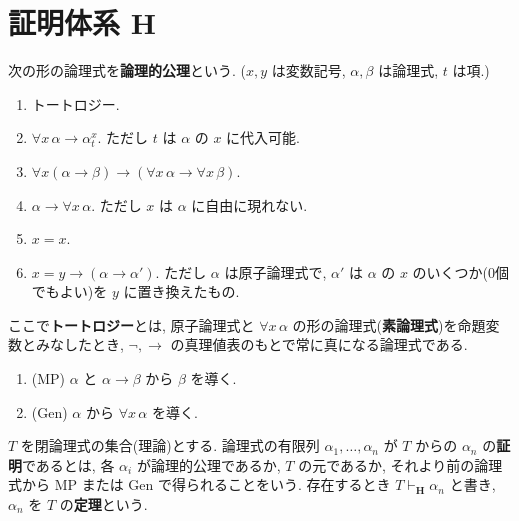\section{証明体系 $\mathbf{H}$}

\begin{dfn}\label{dfn:hilbert}
  次の形の論理式を\textbf{論理的公理}という. ($x, y$ は変数記号, $\alpha, \beta$ は論理式, $t$ は項.)
  \begin{enumerate}[label=(A\arabic*)]
    \item トートロジー.
    \item $\forall x\,\alpha \to \alpha^x_t$. ただし $t$ は $\alpha$ の $x$ に代入可能.
    \item $\forall x(\alpha \to \beta) \to (\forall x\,\alpha \to \forall x\,\beta)$.
    \item $\alpha \to \forall x\,\alpha$. ただし $x$ は $\alpha$ に自由に現れない.
    \item $x = x$.
    \item $x = y \to (\alpha \to \alpha')$. ただし $\alpha$ は原子論理式で, $\alpha'$ は $\alpha$ の $x$ のいくつか(0個でもよい)を $y$ に置き換えたもの.
  \end{enumerate}
  ここで\textbf{トートロジー}とは, 原子論理式と $\forall x\,\alpha$ の形の論理式(\textbf{素論理式})を命題変数とみなしたとき, $\neg, \to$ の真理値表のもとで常に真になる論理式である.
\end{dfn}

\begin{dfn}[推論規則]
  \begin{enumerate}[label=(R\arabic*)]
    \item (MP) $\alpha$ と $\alpha \to \beta$ から $\beta$ を導く.
    \item (Gen) $\alpha$ から $\forall x\,\alpha$ を導く.
  \end{enumerate}
\end{dfn}

\begin{dfn}[証明・定理]
  $T$ を閉論理式の集合(理論)とする. 論理式の有限列 $\alpha_1, \ldots, \alpha_n$ が $T$ からの $\alpha_n$ の\textbf{証明}であるとは, 各 $\alpha_i$ が論理的公理であるか, $T$ の元であるか, それより前の論理式から MP または Gen で得られることをいう. 存在するとき $T \vdash_{\mathbf{H}} \alpha_n$ と書き, $\alpha_n$ を $T$ の\textbf{定理}という.
\end{dfn}

